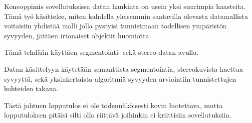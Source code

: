 
Koneoppimis sovellutuksissa datan hankinta on usein yksi suurimpia haasteita. 
Tämä työ käsittelee, miten kahdella yleisemmin saatavilla olevasta datamallista voitaisiin yhdistää malli jolla pystyisi tunnistmaan todellisen ympäristön syvyyden, jättäen irtonaiset objektit huomiotta.

Tämä tehdään käyttäen segmentointi- sekä stereo-datan avulla.

Datan käsittelyyn käytetään semanttista segmentointia, stereokuvista haettua syvyyttä,
sekä yksinkertaista algoritmiä syvyyden arviointiin tunnistettujen kohteiden takana.

Tästä johtuen lopputulos ei ole todennäköisesti kovin luotettava,
mutta lopputuloksen pitäisi silti olla riittävä joihinkin ei kriittisiin sovellutuksiin.
